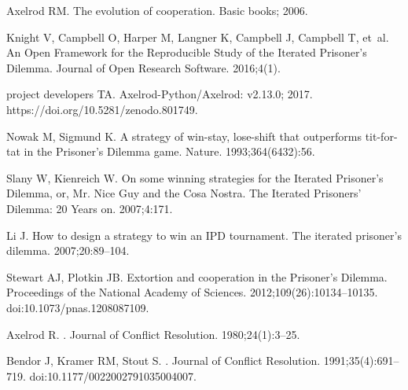 \documentclass[10pt,letterpaper]{article}
\begin{document}
\nolinenumbers

%
%
%

\begin{thebibliography}{10}

Axelrod RM.
\newblock The evolution of cooperation.
\newblock Basic books; 2006.

Knight V, Campbell O, Harper M, Langner K, Campbell J, Campbell T, et~al.
\newblock An Open Framework for the Reproducible Study of the Iterated
  Prisoner’s Dilemma.
\newblock Journal of Open Research Software. 2016;4(1).

project developers TA. Axelrod-Python/Axelrod: v2.13.0; 2017.
\newblock https://doi.org/10.5281/zenodo.801749.

Nowak M, Sigmund K.
\newblock A strategy of win-stay, lose-shift that outperforms tit-for-tat in
  the Prisoner's Dilemma game.
\newblock Nature. 1993;364(6432):56.

Slany W, Kienreich W.
\newblock On some winning strategies for the Iterated Prisoner’s Dilemma, or,
  Mr. Nice Guy and the Cosa Nostra.
\newblock The Iterated Prisoners' Dilemma: 20 Years on. 2007;4:171.

Li J.
\newblock How to design a strategy to win an IPD tournament.
\newblock The iterated prisoner’s dilemma. 2007;20:89--104.

Stewart AJ, Plotkin JB.
\newblock Extortion and cooperation in the Prisoner’s Dilemma.
\newblock Proceedings of the National Academy of Sciences.
  2012;109(26):10134--10135.
\newblock doi:{10.1073/pnas.1208087109}.

Axelrod R.
.
\newblock Journal of Conflict Resolution. 1980;24(1):3--25.

Bendor J, Kramer RM, Stout S.
.
\newblock Journal of Conflict Resolution. 1991;35(4):691--719.
\newblock doi:{10.1177/0022002791035004007}.


\end{thebibliography}
\end{document}
